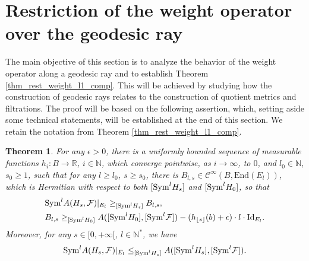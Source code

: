 \documentclass[12pt]{article}
\numberwithin{equation}{section}
\theoremstyle{theorem}
\newtheorem{thm}{Theorem}[section]
\theoremstyle{definition}
\theoremstyle{remark}
\newcommand{\real}{\mathbb{R}}
\newcommand{\nat}{\mathbb{N}}
\newcommand{\enmr}[1]{\text{End}{(#1)}}
\newcommand{\ccal}{\mathscr{C}}
\begin{document}
	\section{Restriction of the weight operator over the geodesic ray}\label{sect_numb_op}
	The main objective of this section is to analyze the behavior of the weight operator along a geodesic ray and to establish Theorem \ref{thm_rest_weight_l1_comp}. 
	This will be achieved by studying how the construction of geodesic rays relates to the construction of quotient metrics and filtrations.
	The proof will be based on the following assertion, which, setting aside some technical statements, will be established at the end of this section. 
	We retain the notation from Theorem \ref{thm_rest_weight_l1_comp}.
	\begin{thm}\label{thm_compar_number2}
		For any $\epsilon > 0$, there is a uniformly bounded sequence of measurable functions $h_i : B \to \real$, $i \in \nat$, which converge pointwise, as $i \to \infty$, to $0$, and $l_0 \in \nat$, $s_0 \geq 1$, such that for any $l \geq l_0$, $s \geq s_0$, there is $B_{l, s} \in \ccal^{\infty}(B, \enmr{E_l})$, which is Hermitian with respect to both $[{\rm{Sym}}^l H_s]$ and $[{\rm{Sym}}^l H_0]$, so that
		\begin{equation}\label{eq_compar_number2}
		\begin{aligned}
			&
			{\rm{Sym}}^l A(H_s, \mathcal{F})|_{E_l}
			\geq_{[{\rm{Sym}}^l H_s]}
			B_{l, s},
			\\
			&
			B_{l, s}
			\geq_{[{\rm{Sym}}^l H_0]}
			A([{\rm{Sym}}^l H_0], [{\rm{Sym}}^l \mathcal{F}])
			-
			( h_{\lfloor s \rfloor}(b) + \epsilon ) \cdot l \cdot {\rm{Id}}_{E_l}.
		\end{aligned}
		\end{equation}
		Moreover, for any $s \in [0, +\infty[$, $l \in \nat^*$, we have
		\begin{equation}\label{eq_compar_number22}
			{\rm{Sym}}^l A(H_s, \mathcal{F})|_{E_l}
			\leq_{[{\rm{Sym}}^l H_s]}
			A([{\rm{Sym}}^l H_s], [{\rm{Sym}}^l \mathcal{F}]).
		\end{equation}
	\end{thm}
\end{document}
